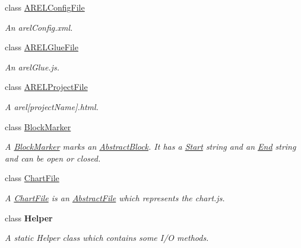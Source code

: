 \begin{DoxyCompactItemize}
class \hyperlink{class_a_rdev_kit_1_1_model_1_1_project_1_1_file_1_1_a_r_e_l_config_file}{A\-R\-E\-L\-Config\-File}
\begin{DoxyCompactList}\small\item\em An arel\-Config.\-xml. \end{DoxyCompactList}\item 
class \hyperlink{class_a_rdev_kit_1_1_model_1_1_project_1_1_file_1_1_a_r_e_l_glue_file}{A\-R\-E\-L\-Glue\-File}
\begin{DoxyCompactList}\small\item\em An arel\-Glue.\-js. \end{DoxyCompactList}\item 
class \hyperlink{class_a_rdev_kit_1_1_model_1_1_project_1_1_file_1_1_a_r_e_l_project_file}{A\-R\-E\-L\-Project\-File}
\begin{DoxyCompactList}\small\item\em A arel\mbox{[}project\-Name\mbox{]}.html. \end{DoxyCompactList}\item 
class \hyperlink{class_a_rdev_kit_1_1_model_1_1_project_1_1_file_1_1_block_marker}{Block\-Marker}
\begin{DoxyCompactList}\small\item\em A \hyperlink{class_a_rdev_kit_1_1_model_1_1_project_1_1_file_1_1_block_marker}{Block\-Marker} marks an \hyperlink{class_a_rdev_kit_1_1_model_1_1_project_1_1_file_1_1_abstract_block}{Abstract\-Block}. It has a \hyperlink{class_a_rdev_kit_1_1_model_1_1_project_1_1_file_1_1_block_marker_a7764ae600714a07a74b8ddf55f1a59d5}{Start} string and an \hyperlink{class_a_rdev_kit_1_1_model_1_1_project_1_1_file_1_1_block_marker_a3672477b3c409c07c7189a57fbd004c4}{End} string and can be open or closed. \end{DoxyCompactList}\item 
class \hyperlink{class_a_rdev_kit_1_1_model_1_1_project_1_1_file_1_1_chart_file}{Chart\-File}
\begin{DoxyCompactList}\small\item\em A \hyperlink{class_a_rdev_kit_1_1_model_1_1_project_1_1_file_1_1_chart_file}{Chart\-File} is an \hyperlink{class_a_rdev_kit_1_1_model_1_1_project_1_1_file_1_1_abstract_file}{Abstract\-File} which represents the chart.\-js. \end{DoxyCompactList}\item 
class {\bfseries Helper}
\begin{DoxyCompactList}\small\item\em A static Helper class which contains some I/\-O methods. \end{DoxyCompactList}\item 

\end{DoxyCompactItemize}
